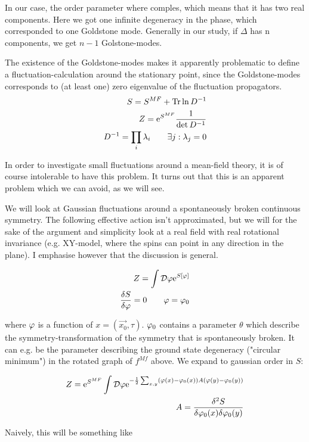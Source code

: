 In our case, the order parameter where comples, which means that it has two real components. Here we got one infinite degeneracy in the phase, which corresponded to one Goldstone mode. Generally in our study, if $\Delta$ has n components, we get $n-1$ Golstone-modes.  

The existence of the Goldstone-modes makes it apparently problematic to define a fluctuation-calculation around the stationary point, since the Goldstone-modes corresponds to (at least one) zero eigenvalue of the fluctuation propagators. 
\begin{align*}
    S = S^{MF} + \Tr \ln D^{-1} \\ 
    Z = \mathrm{e}^{S^{MF}}\frac{1}{\det D^{-1}} \\ 
    D^{-1} = \prod_i \lambda_i \quad \quad \exists j : \lambda_j = 0 
\end{align*}

In order to investigate small fluctuations around a mean-field theory, it is of course intolerable to have this problem. It turns out that this is an apparent problem which we can avoid, as we will see. 

We will look at Gaussian fluctuations around a spontaneously broken continuous symmetry. The following effective action isn't approximated, but we will for the sake of the argument and simplicity look at a real field with real rotational invariance (e.g. XY-model, where the spins can point in any direction in the plane). I emphasise however that the discussion is general. 

\begin{align*}
    Z = \int \D \p \e^{S[\p]} \\ 
    \fdv{S}{\p} = 0 \quad \quad  \p = \p_0
\end{align*}

where $\varphi$ is a function of $x = (\Vec{x_0}, \tau)$. $\varphi_0$ contains a parameter $\theta$ which describe the symmetry-transformation of the symmetry that is spontaneously broken. It can e.g. be the parameter describing the ground state degeneracy ("circular minimum") in the rotated graph of $f^{Mf}$ above. We expand to gaussian order in $S$:

\begin{align*}
    Z = \e^{S^{MF}}\int \D \p \e^{-\frac{1}{2}\sum_{x,y} (\p(x) - \p_0(x)) A (\p(y) - \p_0(y))} \\
    A = \fdv{^2S}{\p_0(x) \delta \p_0(y)}
\end{align*}

Naively, this will be something like 

